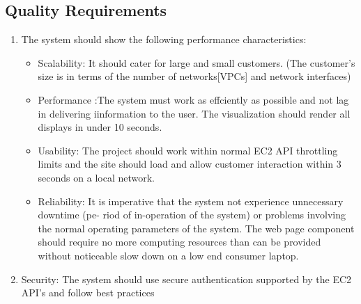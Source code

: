 \documentclass[a4paper,12pt]{report}
\begin{document}
	\subsection{Quality Requirements}
	\begin{enumerate}
		\item The system should show the following performance characteristics:
		\begin{itemize}
			\item Scalability:  It should cater for large and small customers. (The customer's size is in terms of the number of networks[VPCs] and network interfaces)
			\item Performance :The system must work as effciently as possible and not lag in delivering iinformation to the user. The visualization should render all displays in under 10 seconds.
			\item Usability: The project should work within normal EC2 API throttling limits and the site should load and allow customer interaction within 3 seconds on a local network.
			\item  Reliability: It is imperative that the system not experience unnecessary downtime (pe-
riod of in-operation of the system) or problems involving the normal operating parameters of the system. The web page component should require no more computing resources than can be provided without noticeable slow down on a low end consumer laptop.
		\end{itemize}
		\item Security: The system should use secure authentication supported by the EC2 API's and follow best practices 
	\end{enumerate}
	
\end{document}
